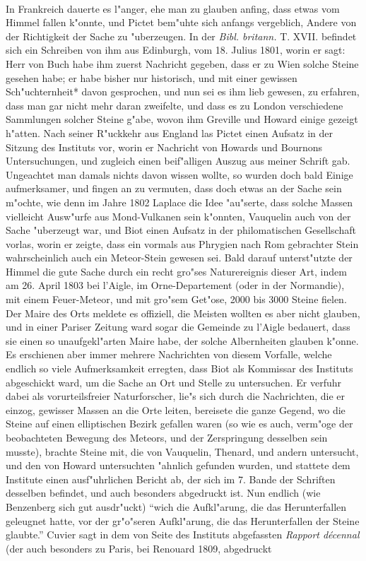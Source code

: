 \documentclass[a4paper, 11pt, oneside, polutonikogreek, german]{article}
\begin{document}
\paragraph{}
In Frankreich dauerte es l"anger, ehe man zu glauben anfing, dass etwas vom Himmel fallen k"onnte, und Pictet bem"uhte sich anfangs vergeblich, Andere von der Richtigkeit der Sache zu "uberzeugen. In der \emph{Bibl. britann.} T. XVII. befindet sich ein Schreiben von ihm aus Edinburgh, vom 18. Julius 1801, worin er sagt: Herr von Buch habe ihm zuerst Nachricht gegeben, dass er zu Wien solche Steine gesehen habe; er habe bisher nur historisch, und mit einer gewissen Sch"uchternheit* davon gesprochen, und nun sei es ihm lieb gewesen, zu erfahren, dass man gar nicht mehr daran zweifelte, und dass es zu London verschiedene Sammlungen solcher Steine g"abe, wovon ihm Greville und Howard einige gezeigt h"atten. Nach seiner R"uckkehr aus England las Pictet einen Aufsatz in der Sitzung des Instituts vor, worin er Nachricht von Howards und Bournons Untersuchungen, und zugleich einen beif"alligen Auszug aus meiner Schrift gab. Ungeachtet man damals nichts davon wissen wollte, so wurden doch bald Einige aufmerksamer, und fingen an zu vermuten, dass doch etwas an der Sache sein m"ochte, wie denn im Jahre 1802 Laplace die Idee "au"serte, dass solche Massen vielleicht Ausw"urfe aus Mond-Vulkanen sein k"onnten, Vauquelin auch von der Sache "uberzeugt war, und Biot einen Aufsatz in der philomatischen Gesellschaft vorlas, worin er zeigte, dass ein vormals aus Phrygien nach Rom gebrachter Stein wahrscheinlich auch ein Meteor-Stein gewesen sei. Bald darauf unterst"utzte der Himmel die gute Sache durch ein recht gro"ses Naturereignis dieser Art, indem am 26. April 1803 bei l'Aigle, im Orne-Departement (oder in der Normandie), mit einem Feuer-Meteor, und mit gro"sem Get"ose, 2000 bis 3000 Steine fielen. Der Maire des Orts meldete es offiziell, die Meisten wollten es aber nicht glauben, und in einer Pariser Zeitung ward sogar die Gemeinde zu l'Aigle bedauert, dass sie einen so unaufgekl"arten Maire habe, der solche Albernheiten glauben k"onne. Es erschienen aber immer mehrere Nachrichten von diesem Vorfalle, welche endlich so viele Aufmerksamkeit erregten, dass Biot als Kommissar des Instituts abgeschickt ward, um die Sache an Ort und Stelle zu untersuchen. Er verfuhr dabei als vorurteilsfreier Naturforscher, lie"s sich durch die Nachrichten, die er einzog, gewisser Massen an die Orte leiten, bereisete die ganze Gegend, wo die Steine auf einen elliptischen Bezirk gefallen waren (so wie es auch, verm"oge der beobachteten Bewegung des Meteors, und der Zerspringung desselben sein musste), brachte Steine mit, die von Vauquelin, Thenard, und andern untersucht, und den von Howard untersuchten "ahnlich gefunden wurden, und stattete dem Institute einen ausf"uhrlichen Bericht ab, der sich im 7. Bande der Schriften desselben befindet, und auch besonders abgedruckt ist. Nun endlich (wie Benzenberg sich gut ausdr"uckt) "`wich die Aufkl"arung, die das Herunterfallen geleugnet hatte, vor der gr"o"seren Aufkl"arung, die das Herunterfallen der Steine glaubte."' Cuvier sagt in dem von Seite des Instituts abgefassten \emph{Rapport décennal} (der auch besonders zu Paris, bei Renouard 1809, abgedruckt 
\end{document}
